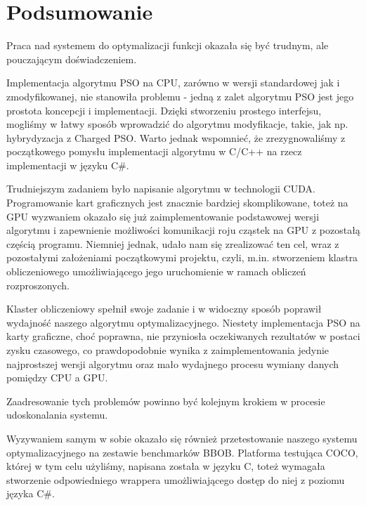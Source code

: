 \documentclass[12pt, twoside, openany, abstract=on]{report}
\theoremstyle{definition}
\begin{document}
\chapter{Podsumowanie}




Praca nad systemem do optymalizacji funkcji  okazała się być trudnym, ale pouczającym doświadczeniem. 

Implementacja algorytmu PSO na CPU, zarówno w wersji standardowej jak i zmodyfikowanej, nie stanowiła problemu - jedną z zalet algorytmu PSO jest jego prostota koncepcji i implementacji. Dzięki stworzeniu prostego interfejsu, mogliśmy w łatwy sposób wprowadzić do algorytmu modyfikacje, takie, jak np. hybrydyzacja z Charged PSO. Warto jednak wspomnieć, że zrezygnowaliśmy z początkowego pomysłu implementacji algorytmu w C/C++ na rzecz implementacji w języku C\#.

Trudniejszym zadaniem było napisanie algorytmu w technologii CUDA. Programowanie kart graficznych jest znacznie bardziej skomplikowane, toteż na GPU wyzwaniem okazało się już zaimplementowanie podstawowej wersji algorytmu i zapewnienie możliwości komunikacji roju cząstek na GPU z pozostałą częścią programu. Niemniej jednak, udało nam się zrealizować ten cel, wraz z pozostałymi założeniami początkowymi projektu, czyli, m.in. stworzeniem klastra obliczeniowego umożliwiającego jego uruchomienie w ramach obliczeń rozproszonych.

Klaster obliczeniowy spełnił swoje zadanie i w widoczny sposób poprawił wydajność naszego algorytmu optymalizacyjnego. Niestety implementacja PSO na karty graficzne, choć poprawna, nie przyniosła oczekiwanych rezultatów w postaci zysku czasowego, co prawdopodobnie wynika z zaimplementowania jedynie najprostszej wersji algorytmu oraz mało wydajnego procesu wymiany danych pomiędzy CPU a GPU. 

Zaadresowanie tych problemów powinno być kolejnym krokiem w procesie udoskonalania systemu. 

Wyzywaniem samym w sobie okazało się również przetestowanie naszego systemu optymalizacyjnego na zestawie benchmarków BBOB. Platforma testująca COCO, której w tym celu użyliśmy, napisana została w języku C, toteż wymagała stworzenie odpowiedniego wrappera umożliwiającego dostęp do niej z poziomu języka C\#.
\end{document}
